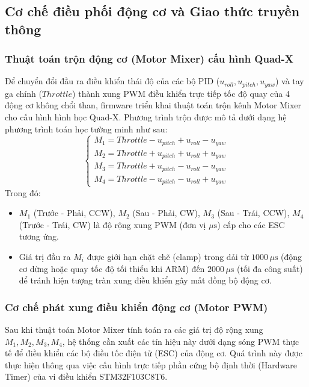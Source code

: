 \subsection{Cơ chế điều phối động cơ và Giao thức truyền thông}

\subsubsection{Thuật toán trộn động cơ (Motor Mixer) cấu hình Quad-X}

Để chuyển đổi đầu ra điều khiển thái độ của các bộ PID ($u_{roll}, u_{pitch}, u_{yaw}$) và tay ga chính ($Throttle$) thành xung PWM điều khiển trực tiếp tốc độ quay của 4 động cơ không chổi than, firmware triển khai thuật toán trộn kênh Motor Mixer cho cấu hình hình học Quad-X. Phương trình trộn được mô tả dưới dạng hệ phương trình toán học tường minh như sau:
\begin{equation}
\begin{cases}
M_1 = Throttle - u_{pitch} + u_{roll} - u_{yaw} \\
M_2 = Throttle + u_{pitch} + u_{roll} + u_{yaw} \\
M_3 = Throttle + u_{pitch} - u_{roll} - u_{yaw} \\
M_4 = Throttle - u_{pitch} - u_{roll} + u_{yaw}
\end{cases}
\end{equation}
Trong đó:
\begin{itemize}
    \item $M_1$ (Trước - Phải, CCW), $M_2$ (Sau - Phải, CW), $M_3$ (Sau - Trái, CCW), $M_4$ (Trước - Trái, CW) là độ rộng xung PWM (đơn vị $\mu\text{s}$) cấp cho các ESC tương ứng.
    \item Giá trị đầu ra $M_i$ được giới hạn chặt chẽ (clamp) trong dải từ $1000\,\mu\text{s}$ (động cơ dừng hoặc quay tốc độ tối thiểu khi ARM) đến $2000\,\mu\text{s}$ (tối đa công suất) để tránh hiện tượng tràn xung điều khiển gây mất đồng bộ động cơ.
\end{itemize}

\subsubsection{Cơ chế phát xung điều khiển động cơ (Motor PWM)}

Sau khi thuật toán Motor Mixer tính toán ra các giá trị độ rộng xung $M_1, M_2, M_3, M_4$, hệ thống cần xuất các tín hiệu này dưới dạng sóng PWM thực tế để điều khiển các bộ điều tốc điện tử (ESC) của động cơ. Quá trình này được thực hiện thông qua việc cấu hình trực tiếp phần cứng bộ định thời (Hardware Timer) của vi điều khiển STM32F103C8T6.

